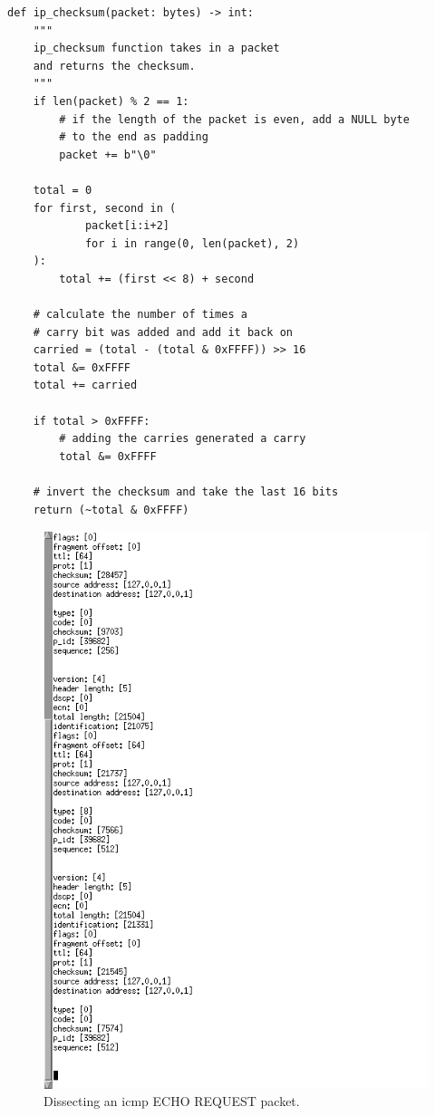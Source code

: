 \documentclass[titlepage]{article}
\begin{document}
\begin{lstlisting}[label=checksum,caption=A function for calculating the IP checksum for a set of btyes.]
def ip_checksum(packet: bytes) -> int:
    """
    ip_checksum function takes in a packet
    and returns the checksum.
    """
    if len(packet) % 2 == 1:
        # if the length of the packet is even, add a NULL byte
        # to the end as padding
        packet += b"\0"

    total = 0
    for first, second in (
            packet[i:i+2]
            for i in range(0, len(packet), 2)
    ):
        total += (first << 8) + second

    # calculate the number of times a
    # carry bit was added and add it back on
    carried = (total - (total & 0xFFFF)) >> 16
    total &= 0xFFFF
    total += carried

    if total > 0xFFFF:
        # adding the carries generated a carry
        total &= 0xFFFF

    # invert the checksum and take the last 16 bits
    return (~total & 0xFFFF)
\end{lstlisting}

\begin{figure}[H]
  \centering
  \includegraphics[width=\textwidth]{screenshots/deconstructed_headers.png}
  \caption{%
    Dissecting an \gls{icmp} ECHO REQUEST packet.
  }\label{echodissect}
\end{figure}
\end{document}
